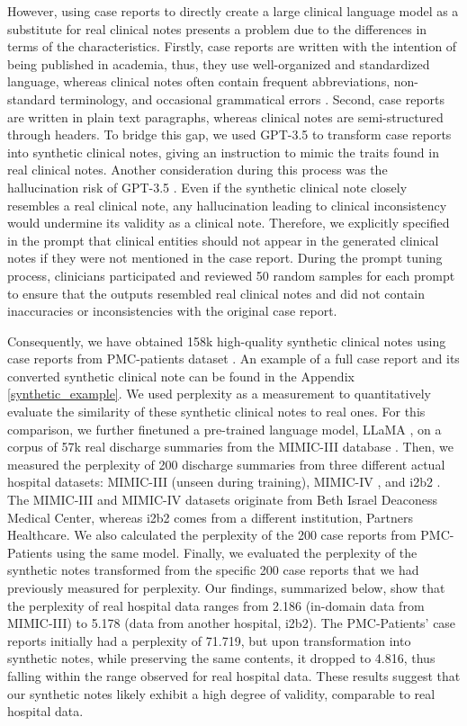 \documentclass[11pt]{article}
\begin{document}
However, using case reports to directly create a large clinical language model as a substitute for real clinical notes presents a problem due to the differences in terms of the characteristics.
Firstly, case reports are written with the intention of being published in academia, thus, they use well-organized and standardized language, whereas clinical notes often contain frequent abbreviations, non-standard terminology, and occasional grammatical errors \citep{lehman2023we}. 
Second, case reports are written in plain text paragraphs, whereas clinical notes are semi-structured through headers.
To bridge this gap, we used GPT-3.5 to transform case reports into synthetic clinical notes, giving an instruction to mimic the traits found in real clinical notes. 
Another consideration during this process was the hallucination risk of GPT-3.5 \citep{ji2023survey}. 
Even if the synthetic clinical note closely resembles a real clinical note, any hallucination leading to clinical inconsistency would undermine its validity as a clinical note. 
Therefore, we explicitly specified in the prompt that clinical entities should not appear in the generated clinical notes if they were not mentioned in the case report. 
During the prompt tuning process, clinicians participated and reviewed 50 random samples for each prompt to ensure that the outputs resembled real clinical notes and did not contain inaccuracies or inconsistencies with the original case report. 


Consequently, we have obtained 158k high-quality synthetic clinical notes using case reports from PMC-patients dataset \citep{zhao2023pmcpatients}. 
An example of a full case report and its converted synthetic clinical note can be found in the Appendix \ref{synthetic_example}.
We used perplexity as a measurement to quantitatively evaluate the similarity of these synthetic clinical notes to real ones.
For this comparison, we further finetuned a pre-trained language model, LLaMA \citep{touvron2023llama}, on a corpus of 57k real discharge summaries from the MIMIC-III database \citep{johnson2016mimic}. 
Then, we measured the perplexity of 200 discharge summaries from three different actual hospital datasets: MIMIC-III (unseen during training), MIMIC-IV \citep{johnson2023mimic}, and i2b2 \citep{uzuner2007evaluating}. 
The MIMIC-III and MIMIC-IV datasets originate from Beth Israel Deaconess Medical Center, whereas i2b2 comes from a different institution, Partners Healthcare. 
We also calculated the perplexity of the 200 case reports from PMC-Patients using the same model.
Finally, we evaluated the perplexity of the synthetic notes transformed from the specific 200 case reports that we had previously measured for perplexity.
Our findings, summarized below, show that the perplexity of real hospital data ranges from 2.186 (in-domain data from MIMIC-III) to 5.178 (data from another hospital, i2b2).
The PMC-Patients' case reports initially had a perplexity of 71.719, but upon transformation into synthetic notes, while preserving the same contents, it dropped to 4.816, thus falling within the range observed for real hospital data.
These results suggest that our synthetic notes likely exhibit a high degree of validity, comparable to real hospital data.
\end{document}

